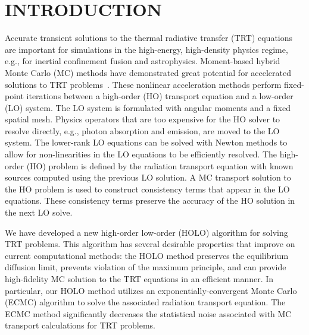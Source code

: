 %
%
%



\pagestyle{plain} %
\setcounter{page}{1}

\chapter{\uppercase {Introduction}}
\label{chp:intro}

Accurate transient solutions to the thermal radiative transfer (TRT) equations are important for
simulations in the
high-energy, high-density physics regime, e.g., for inertial
confinement fusion and astrophysics.  Moment-based hybrid Monte Carlo (MC)
methods have demonstrated great potential for accelerated
solutions to TRT problems~\cite{rmc,bolding_nse,holo_rh}.   These nonlinear acceleration
methods perform fixed-point iterations  between a
high-order (HO) transport equation and a low-order (LO) system. The LO system is
formulated with angular moments and a fixed spatial mesh.  Physics operators that are too
expensive for the HO solver to resolve directly, e.g., photon absorption and emission, are
moved to the LO system. The lower-rank LO equations can be solved with Newton methods to
allow for non-linearities in the LO equations to be efficiently resolved.  The high-order
(HO) problem is defined by the radiation transport equation with known sources computed
using the previous LO solution. A MC transport solution to the HO problem is used to
construct consistency terms that appear in the LO equations. These consistency terms
preserve the accuracy of the HO solution in the next LO solve.

We have developed a new high-order low-order (HOLO) algorithm for solving TRT problems. This algorithm has several desirable
properties that improve on current computational methods: the HOLO method preserves the equilibrium diffusion limit, prevents violation
of the maximum principle, and can provide high-fidelity MC solution to the TRT equations in an efficient
manner.  In particular, our HOLO method utilizes an exponentially-convergent
Monte Carlo (ECMC) algorithm to solve the associated radiation transport
equation.  The ECMC method significantly decreases the statistical noise
associated with MC transport calculations for TRT problems. 

